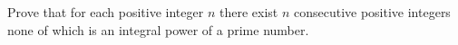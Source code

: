 Prove that for each positive integer $n$ there exist $n$ consecutive positive integers none of which is an integral power of a prime number.
